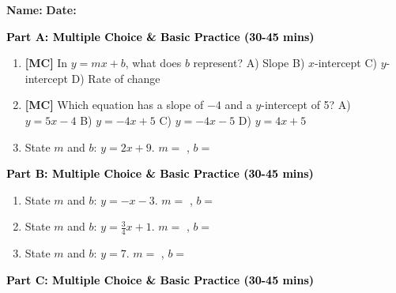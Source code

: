 \documentclass[12pt, letterpaper, fleqn]{article}
\newcommand{\blank}{\underline{\hspace{2.2cm}}}
\begin{document}
\textbf{Name:} \underline{\hspace{5cm}}
\hfill
\textbf{Date:} \underline{\hspace{3cm}}\\


\begin{tcolorbox}[colback=customteal!20]
\large\textcolor{black}{\textbf{Part A: Multiple Choice \& Basic Practice (30-45 mins)}}
\end{tcolorbox}

\vspace{3mm}

\begin{enumerate}[itemsep=2.5cm, leftmargin=0.6cm]
\item \textbf{[MC]} In $y = mx+b$, what does $b$ represent?
A) Slope B) $x$-intercept C) $y$-intercept D) Rate of change
\item \textbf{[MC]} Which equation has a slope of $-4$ and a $y$-intercept of 5?
A) $y = 5x - 4$ B) $y = -4x + 5$ C) $y = -4x - 5$ D) $y = 4x + 5$
\item State $m$ and $b$: $y = 2x + 9$. $m=$ \blank, $b=$ \blank
\end{enumerate}

\newpage

\begin{tcolorbox}[colback=customteal!20]
\large\textcolor{black}{\textbf{Part B: Multiple Choice \& Basic Practice (30-45 mins)}}
\end{tcolorbox}

\vspace{3mm}

\begin{enumerate}[itemsep=2.5cm, leftmargin=0.6cm, resume]
\item State $m$ and $b$: $y = -x - 3$. $m=$ \blank, $b=$ \blank
\item State $m$ and $b$: $y = \frac{3}{4}x + 1$. $m=$ \blank, $b=$ \blank
\item State $m$ and $b$: $y = 7$. $m=$ \blank, $b=$ \blank
\end{enumerate}

\newpage

\begin{tcolorbox}[colback=customteal!20]
\large\textcolor{black}{\textbf{Part C: Multiple Choice \& Basic Practice (30-45 mins)}}
\end{tcolorbox}

\vspace{3mm}
\end{document}
